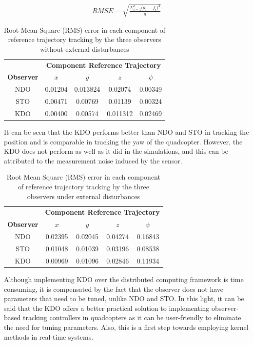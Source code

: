\documentclass[letterpaper%
, twoside%
, 12pt%
,memoire%
, english%
,creativecommons,hyperref%
]{thETS}
\begin{document}
\begin{align}\label{eqn:rmse}
 RMSE = \sqrt{\frac{\Sigma_{i=1}^{n}{\big({d_i -f_i}\big)^2}}{n}}
\end{align}

\begin{table}
\parbox{0.65\textwidth}{\caption{Root Mean Square (RMS) error in each component of reference trajectory tracking by the three observers without external disturbances}\label{Tab:rmse}}
\begin{tabular}{|c|c|c|c|c|}
\hline
         & \multicolumn{4}{c|}{\textbf{Component Reference Trajectory}}\\\cline{2-5} 
\textbf{Observer} &   $x$   &  $y$     &   $z$    & $\psi$  \\ \hline
NDO      & 0.01204 & 0.013824 & 0.02074  & 0.00349 \\
STO      & 0.00471 & 0.00769  & 0.01139   & 0.00324 \\
KDO      & 0.00400 & 0.00574  & 0.011312 & 0.02469 \\
\hline
\end{tabular}
\end{table}

It can be seen that the KDO performs better than NDO and STO in tracking the position and is comparable in tracking the yaw of the quadcopter. However, the KDO does not perform as well as it did in the simulations, and this can be attributed to the measurement noise induced by the sensor. 

\begin{table}
\parbox{0.65\textwidth}{\caption{Root Mean Square (RMS) error in each component of reference trajectory tracking by the three observers under external disturbances}\label{Tab:rmseDist}}
\begin{tabular}{|c|c|c|c|c|}
\hline
         & \multicolumn{4}{c|}{\textbf{Component Reference Trajectory}}\\\cline{2-5} 
\textbf{Observer} &   $x$   &  $y$     &   $z$    & $\psi$  \\ \hline
NDO      & 0.02395 & 0.02045  & 0.04274  & 0.16843 \\
STO      & 0.01048 & 0.01039  & 0.03196  & 0.08538 \\
KDO      & 0.00969 & 0.01096  & 0.02846  & 0.11934 \\
\hline
\end{tabular}
\end{table}

Although implementing KDO over the distributed computing framework is time consuming, it is compensated by the fact that the observer does not have parameters that need to be tuned, unlike NDO and STO. In this light, it can be said that the KDO offers a better practical solution to implementing observer-based tracking controllers in quadcopters as it can be user-friendly to eliminate the need for tuning parameters. Also, this is a first step towards employing kernel methods in real-time systems. 
\end{document}
